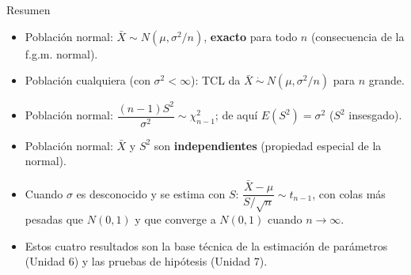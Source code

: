 \documentclass[aspectratio=169,11pt]{beamer}
\begin{document}
\begin{frame}{Resumen}
\begin{itemize}
\item Población normal: $\bar X \sim N(\mu,\sigma^2/n)$, \textbf{exacto} para todo $n$ (consecuencia de la f.g.m. normal).
\item Población cualquiera (con $\sigma^2<\infty$): TCL da $\bar X \ \dot\sim\ N(\mu,\sigma^2/n)$ para $n$ grande.
\item Población normal: $\dfrac{(n-1)S^2}{\sigma^2}\sim \chi^2_{n-1}$; de aquí $E(S^2)=\sigma^2$ ($S^2$ insesgado).
\item Población normal: $\bar X$ y $S^2$ son \textbf{independientes} (propiedad especial de la normal).
\item Cuando $\sigma$ es desconocido y se estima con $S$: $\dfrac{\bar X-\mu}{S/\sqrt n}\sim t_{n-1}$, con colas más pesadas que $N(0,1)$ y que converge a $N(0,1)$ cuando $n\to\infty$.
\item Estos cuatro resultados son la base técnica de la estimación de parámetros (Unidad 6) y las pruebas de hipótesis (Unidad 7).
\end{itemize}
\end{frame}
\end{document}
